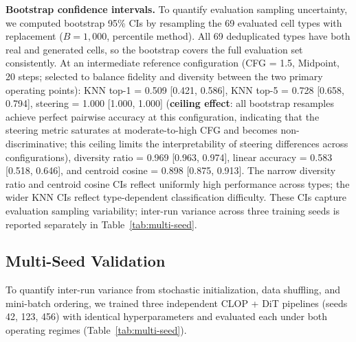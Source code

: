 \documentclass[11pt,a4paper]{article}
\begin{document}
\textbf{Bootstrap confidence intervals.} To quantify evaluation sampling uncertainty, we computed bootstrap 95\% CIs by resampling the 69 evaluated cell types with replacement ($B{=}1{,}000$, percentile method). All 69 deduplicated types have both real and generated cells, so the bootstrap covers the full evaluation set consistently. At an intermediate reference configuration (CFG = 1.5, Midpoint, 20 steps; selected to balance fidelity and diversity between the two primary operating points): KNN top-1 = 0.509 [0.421, 0.586], KNN top-5 = 0.728 [0.658, 0.794], steering = 1.000 [1.000, 1.000] (\textbf{ceiling effect}: all bootstrap resamples achieve perfect pairwise accuracy at this configuration, indicating that the steering metric saturates at moderate-to-high CFG and becomes non-discriminative; this ceiling limits the interpretability of steering differences across configurations), diversity ratio = 0.969 [0.963, 0.974], linear accuracy = 0.583 [0.518, 0.646], and centroid cosine = 0.898 [0.875, 0.913]. The narrow diversity ratio and centroid cosine CIs reflect uniformly high performance across types; the wider KNN CIs reflect type-dependent classification difficulty. These CIs capture evaluation sampling variability; inter-run variance across three training seeds is reported separately in Table~\ref{tab:multi-seed}.

\subsection{Multi-Seed Validation}\label{sec:multi-seed-results}

To quantify inter-run variance from stochastic initialization, data shuffling, and mini-batch ordering, we trained three independent CLOP + DiT pipelines (seeds 42, 123, 456) with identical hyperparameters and evaluated each under both operating regimes (Table~\ref{tab:multi-seed}).
\end{document}
